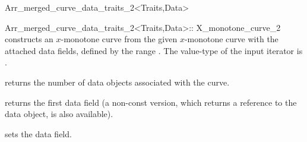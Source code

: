 \begin{ccRefClass}{Arr_merged_curve_data_traits_2<Traits,Data>}
\begin{ccClass}{Arr_merged_curve_data_traits_2<Traits,Data>::
                X_monotone_curve_2}
    {constructs an $x$-monotone curve from the given  $x$-monotone
     curve with the attached data fields, defined by the range 
     \ccc{[begin,end)}. The value-type of the input iterator is .}

\ccAccessFunctions

  {returns the number of data objects associated with the curve.}

  {returns the first data field (a non-const version, which returns a reference
   to the data object, is also available).
   }


  {sets the data field.}

\end{ccClass}

\end{ccRefClass}

\ccRefPageEnd

